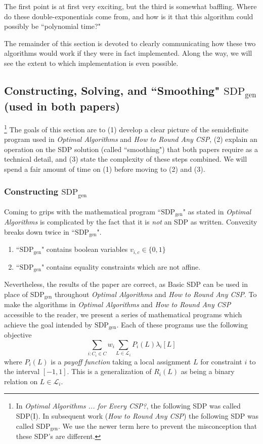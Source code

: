 \documentclass[letterpaper, 12pt]{article}
\numberwithin{equation}{section}
\begin{document}
The first point is at first very exciting, but the third is somewhat baffling. Where do these double-exponentials come from, and how is it that this algorithm could possibly be ``polynomial time?"

The remainder of this section is devoted to clearly communicating how these two algorithms would work if they were in fact implemented. Along the way, we will see the extent to which implementation is even possible.
\subsection{Constructing, Solving, and ``Smoothing" $\text{SDP}_{\text{gen}}$ (used in both papers)}\footnote{In \textit{Optimal Algorithms ... for Every CSP?}, the following SDP was called SDP(I). In subsequent work (\textit{How to Round Any CSP}) the following SDP was called $\text{SDP}_{\text{gen}}$. We use the newer term here to prevent the misconception that these SDP's are different.
}
The goals of this section are to (1) develop a clear picture of the semidefinite program used in \textit{Optimal Algorithms} and \textit{How to Round Any CSP}, (2) explain an operation on the SDP solution (called ``smoothing") that both papers require as a technical detail, and (3) state the complexity of these steps combined. We will spend a fair amount of time on (1) before moving to (2) and (3).
\subsubsection{Constructing $\text{SDP}_{\text{gen}}$}
Coming to grips with the mathematical program ``$\text{SDP}_{\text{gen}}$" as stated in \textit{Optimal Algorithms} is complicated by the fact that it is \textit{not} an SDP as written. Convexity breaks down twice in ``$\text{SDP}_{\text{gen}}$".
\begin{enumerate}
\item ``$\text{SDP}_{\text{gen}}$" contains boolean variables $v_{i,c} \in \{0,1\}$
\item ``$\text{SDP}_{\text{gen}}$" contains equality constraints which are not affine.
\end{enumerate}
Nevertheless, the results of the paper are correct, as Basic SDP can be used in place of $\text{SDP}_{\text{gen}}$ throughout \textit{Optimal Algorithms} and \textit{How to Round Any CSP}. To make the algorithms in \textit{Optimal Algorithms} and \textit{How to Round Any CSP} accessible to the reader, we present a series of mathematical programs which achieve the goal intended by $\text{SDP}_{\text{gen}}$. Each of these programs use the following objective
\begin{equation}
\sum_{i : C_i \in C} w_i \sum_{L \in \mathcal{L}_i} P_i(L) \lambda_i[L]
\end{equation}
where $P_i(L)$ is a \textit{payoff function} taking a local assignment $L$ for constraint $i$ to the interval $[-1,1]$. This is a generalization of $R_i(L)$ as being a binary relation on $L \in \mathcal{L}_i$.
\end{document}

